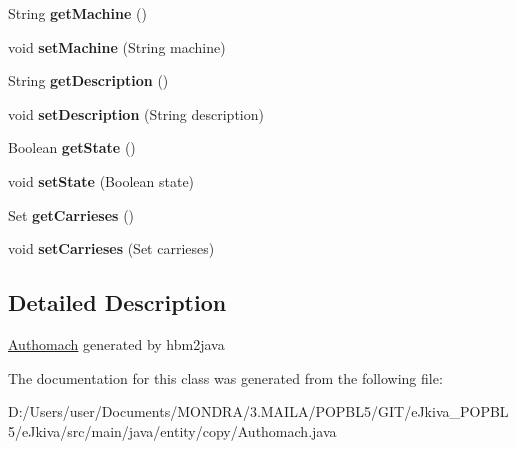 \begin{DoxyCompactItemize}
\mbox{\label{classentity_1_1copy_1_1_authomach_a360be33d879aae5e3fbb859c796b44b8}} 
String {\bfseries get\+Machine} ()
\item 
\mbox{\label{classentity_1_1copy_1_1_authomach_a416244e1374670a0f9399e7010dc07e0}} 
void {\bfseries set\+Machine} (String machine)
\item 
\mbox{\label{classentity_1_1copy_1_1_authomach_a615a9608fba84c4c8b90976c23d63586}} 
String {\bfseries get\+Description} ()
\item 
\mbox{\label{classentity_1_1copy_1_1_authomach_abe84ee8ba1e2df0f8c818bb92652d9ce}} 
void {\bfseries set\+Description} (String description)
\item 
\mbox{\label{classentity_1_1copy_1_1_authomach_ac23c04925ebda9994235b16790921776}} 
Boolean {\bfseries get\+State} ()
\item 
\mbox{\label{classentity_1_1copy_1_1_authomach_a28335b1654f0e0f618c370a26a4534c9}} 
void {\bfseries set\+State} (Boolean state)
\item 
\mbox{\label{classentity_1_1copy_1_1_authomach_a09a43e7c6e2261338ff4525792ad3293}} 
Set {\bfseries get\+Carrieses} ()
\item 
\mbox{\label{classentity_1_1copy_1_1_authomach_a252f59dee99ca828f6e5ee93c08d9a7e}} 
void {\bfseries set\+Carrieses} (Set carrieses)
\end{DoxyCompactItemize}


\subsection{Detailed Description}
\mbox{\hyperlink{classentity_1_1copy_1_1_authomach}{Authomach}} generated by hbm2java 

The documentation for this class was generated from the following file\+:\begin{DoxyCompactItemize}
\item 
D\+:/\+Users/user/\+Documents/\+M\+O\+N\+D\+R\+A/3.\+M\+A\+I\+L\+A/\+P\+O\+P\+B\+L5/\+G\+I\+T/e\+Jkiva\+\_\+\+P\+O\+P\+B\+L5/e\+Jkiva/src/main/java/entity/copy/Authomach.\+java\end{DoxyCompactItemize}
